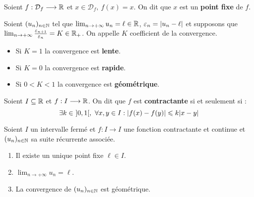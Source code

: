 \begin{definition}
	Soient $f : \mathcal{D}_f \longrightarrow \mathbb{R}$ et $x \in \mathcal{D}_f,\ f(x) = x$. On dit que $x$ est un \textbf{point fixe} de $f$.
\end{definition}

\begin{definition}
    Soient $(u_n)_{n \in \mathbb{N}}$ tel que $\lim_{n \to +\infty} u_n = \ell \in \mathbb{R}$, $\varepsilon_n = \abs{u_n - \ell}$ et supposons que $\lim_{n \to +\infty} \frac{\varepsilon_{n + 1}}{\varepsilon_n} = K \in \mathbb{R}_+$. 
    On appelle $K$ coefficient de la convergence.
    \begin{itemize}
        \item Si $K = 1$ la convergence est \textbf{lente}.
        \item Si $K = 0$ la convergence est \textbf{rapide}.
        \item Si $0 < K < 1$ la convergence est \textbf{géométrique}.
    \end{itemize}
\end{definition}

\begin{definition}
	Soient $I \subseteq \mathbb{R}$ et $f : I \longrightarrow \mathbb{R}$.
    On dit que $f$ est \textbf{contractante} si et seulement si :
    \[ \exists k \in \ ]0, 1[,\ \forall x, y \in I : \abs{f(x) - f(y)} \leqslant k \abs{x - y} \]
\end{definition}

\begin{theorem}
	Soient $I$ un intervalle fermé et $f : I \longrightarrow I$ une fonction contractante et continue et $(u_n)_{n \in \mathbb{N}}$ sa suite récurrente associée.
	\begin{enumerate}
        \item Il existe un unique point fixe $\ell \in I$.
        \item $\lim_{n \to +\infty} u_n = \ell$.
        \item La convergence de $(u_n)_{n \in \mathbb{N}}$ est géométrique.
    \end{enumerate}
\end{theorem}


